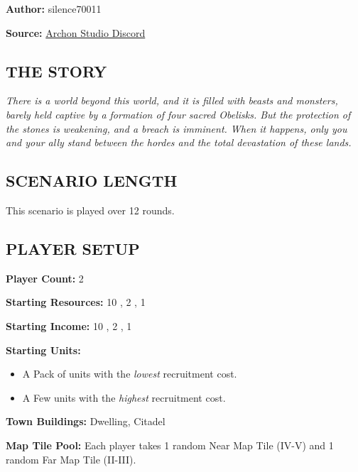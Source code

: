 
\begin{multicols*}{2}

\textbf{Author:} silence70011

\textbf{Source:} \href{https://discord.com/channels/740870068178649108/1233112440322002964/1233112440322002964}{Archon Studio Discord}

\subsection*{\MakeUppercase{The Story}}

\textit{There is a world beyond this world, and it is filled with beasts and monsters, barely held captive by a formation of four sacred Obelisks.
  But the protection of the stones is weakening, and a breach is imminent.
  When it happens, only you and your ally stand between the hordes and the total devastation of these lands.
}

\subsection*{\MakeUppercase{Scenario length}}

This scenario is played over 12 rounds.

\subsection*{\MakeUppercase{Player Setup}}

\textbf{Player Count:} 2

\textbf{Starting Resources:} 10 , 2 , 1 

\textbf{Starting Income:} 10 , 2 , 1 

\textbf{Starting Units:}
\begin{itemize}
  \item A Pack of  units with the \textit{lowest} recruitment cost.
  \item A Few  units with the \textit{highest} recruitment cost.
\end{itemize}

\textbf{Town Buildings:}  Dwelling, Citadel

\textbf{Map Tile Pool:} Each player takes 1 random Near Map Tile (IV-V) and 1 random Far Map Tile (II-III).


\end{multicols*}
